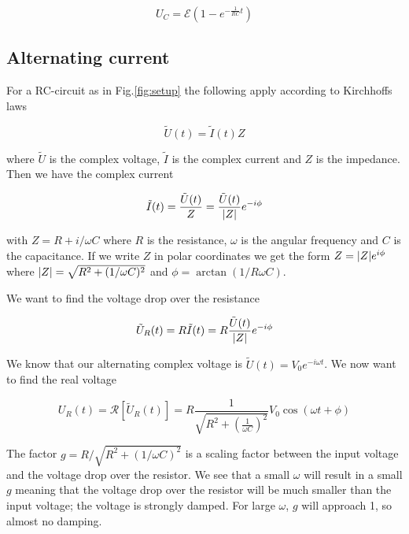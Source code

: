 \documentclass[../main/main.tex]{subfiles}
\begin{document}
\begin{equation}
  U_C = \mathcal{E} \left( 1 - e^{- \frac{1}{RC} t} \right)
\end{equation}

\subsection*{Alternating current}

For a RC-circuit as in Fig.\ref{fig:setup} the following apply according to Kirchhoffs laws

\begin{equation}
	\tilde{U}(t) = \tilde{I}(t)Z
\end{equation}

where \( \tilde{U} \) is the complex voltage, \( \tilde{I} \) is the complex current and \( Z \) is the impedance. Then we have the complex current

\begin{equation}
	\tilde{I}(t) = \frac{\tilde{U}(t)}{Z} = \frac{\tilde{U}(t)}{ \abs{Z}} e^{-i \phi}
\end{equation}

with \( Z = R + i/ \omega C \) where \( R \) is the resistance, \(\omega \) is the angular frequency and \( C \) is the capacitance.
If we write \( Z \) in polar coordinates we get the form \( Z = \abs{Z} e^{i \phi} \) where \( \abs{Z} = \sqrt{R^2 + (1/\omega C)^2} \) and \( \phi = \arctan(1 / R \omega C ) \).

We want to find the voltage drop over the resistance

\begin{equation}
	\tilde{U}_R(t) = R \tilde{I}(t) = R \frac{\tilde{U}(t)}{ \abs{Z}} e^{-i \phi}
\end{equation}

We know that our alternating complex voltage is \( \tilde{U}(t) = V_0 e^{-i \omega t } \).
We now want to find the real voltage

\begin{equation}
	U_R(t) = \mathcal{R}[\tilde{U}_R(t)] = R \frac{1}{ \sqrt{R^2 + \left( \frac{1}{ \omega C } \right)^2 } } V_0 \cos ( \omega t + \phi)
\end{equation}

The factor \( g = R / \sqrt{R^2 + ( 1 / \omega C )^2} \) is a scaling factor between the input voltage and the voltage drop over the resistor.
We see that a small \( \omega \) will result in a small \( g \) meaning that the voltage drop over the resistor will be much smaller than the input voltage; the voltage is strongly damped.
For large \( \omega \), \( g \) will approach 1, so almost no damping.
\end{document}
